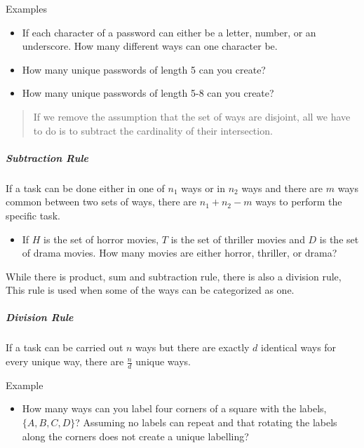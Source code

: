 Examples

\begin{itemize}
\tightlist
\item
  If each character of a password can either be a letter, number, or an
  underscore. How many different ways can one character be.
\item
  How many unique passwords of length 5 can you create?
\item
  How many unique passwords of length 5-8 can you create?
\end{itemize}

\begin{quote}
If we remove the assumption that the set of ways are disjoint, all we
have to do is to subtract the cardinality of their intersection.
\end{quote}

\hypertarget{subtraction-rule}{%
\subparagraph{Subtraction Rule}\label{subtraction-rule}}

If a task can be done either in one of \textbf{\(n_1\)} ways or in
\textbf{\(n_2\)} ways and there are \textbf{\(m\)} ways common between
two sets of ways, there are \textbf{\(n_1 + n_2-m\)} ways to perform the
specific task.

\begin{itemize}
\tightlist
\item
  If \textbf{\(H\)} is the set of horror movies, \textbf{\(T\)} is the
  set of thriller movies and \textbf{\(D\)} is the set of drama movies.
  How many movies are either horror, thriller, or drama?
\end{itemize}

While there is product, sum and subtraction rule, there is also a
division rule, This rule is used when some of the ways can be
categorized as one.

\hypertarget{division-rule}{%
\subparagraph{Division Rule}\label{division-rule}}

If a task can be carried out \textbf{\(n\)} ways but there are exactly
\textbf{\(d\)} identical ways for every unique way, there are
\textbf{\(\frac{n}{d}\)} unique ways.

Example

\begin{itemize}
\tightlist
\item
  How many ways can you label four corners of a square with the labels,
  \textbf{\(\{A,B,C,D\}\)}? Assuming no labels can repeat and that
  rotating the labels along the corners does not create a unique
  labelling?
\end{itemize}

